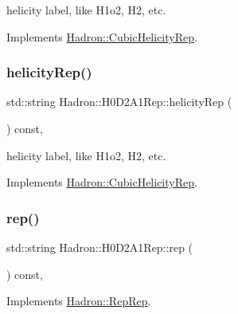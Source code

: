 helicity label, like H1o2, H2, etc. 

Implements \mbox{\hyperlink{structHadron_1_1CubicHelicityRep_af1096946b7470edf0a55451cc662f231}{Hadron\+::\+Cubic\+Helicity\+Rep}}.

\mbox{\label{structHadron_1_1H0D2A1Rep_ae0a667c77e5bdd60a1225ac10f4e1247}} 
\subsubsection{\texorpdfstring{helicityRep()}{helicityRep()}\hspace{0.1cm}{\footnotesize\ttfamily [3/3]}}
{\footnotesize\ttfamily std\+::string Hadron\+::\+H0\+D2\+A1\+Rep\+::helicity\+Rep (\begin{DoxyParamCaption}{ }\end{DoxyParamCaption}) const\hspace{0.3cm}{\ttfamily [inline]}, {\ttfamily [virtual]}}

helicity label, like H1o2, H2, etc. 

Implements \mbox{\hyperlink{structHadron_1_1CubicHelicityRep_af1096946b7470edf0a55451cc662f231}{Hadron\+::\+Cubic\+Helicity\+Rep}}.

\mbox{\label{structHadron_1_1H0D2A1Rep_ac7e30eadba7f3a5049f2bde305ca28c5}} 
\subsubsection{\texorpdfstring{rep()}{rep()}\hspace{0.1cm}{\footnotesize\ttfamily [1/5]}}
{\footnotesize\ttfamily std\+::string Hadron\+::\+H0\+D2\+A1\+Rep\+::rep (\begin{DoxyParamCaption}{ }\end{DoxyParamCaption}) const\hspace{0.3cm}{\ttfamily [inline]}, {\ttfamily [virtual]}}



Implements \mbox{\hyperlink{structHadron_1_1RepRep_ab3213025f6de249f7095892109575fde}{Hadron\+::\+Rep\+Rep}}.

\mbox{\label{structHadron_1_1H0D2A1Rep_ac7e30eadba7f3a5049f2bde305ca28c5}} 
